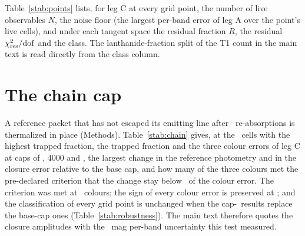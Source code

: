 \documentclass[11pt]{article}
\newcommand{\Cboth}{C\xspace}
\newcommand{\Aleg}{A\xspace}
\newcommand{\dRT}{d_{\rm RT}}
\newcommand{\Xlan}{X_{\rm 4Ln}}
\newcommand{\Mej}{M_{\rm ej}}
\newcommand{\vej}{v_{\rm ej}}
\newcommand{\chires}{\chi^2_{\rm res}/{\rm dof}}
\newcommand{\Msun}{M_\odot}
\begin{document}
Table~\ref{stab:points} lists, for leg \Cboth at every grid point, the number of live observables $N$, the noise floor (the largest per-band error of leg \Aleg over the point's live cells), and under each tangent space the residual fraction $R$, the residual $\chires$ and the class. The lanthanide-fraction split of the T1 count in the main text is read directly from the class column.

\begin{table}
\centering
\caption{\textbf{Leg \Cboth at every grid point under the four tangent spaces.} T0: $(\ln\Mej,\ln\vej,\ln\Xlan)$; T1: T0 with a free grey magnitude per epoch; T2: T0 with a free colour temperature; T3: T0 with a free blue second component. A dash marks a point with no evaluable fit.}
\label{stab:points}
\scriptsize

\end{table}

\clearpage
\section{The chain cap}\label{ssec:chain}

A reference packet that has not escaped its emitting line after \ChainBase\ re-absorptions is thermalized in place (Methods). Table~\ref{stab:chain} gives, at the \ChainCells\ cells with the highest trapped fraction, the trapped fraction and the three colour errors of leg \Cboth at caps of \ChainBase, 4000 and \ChainTop, the largest change in the reference photometry and in the closure error relative to the base cap, and how many of the three colours met the pre-declared criterion that the change stay below \ChainRelMax\ of the colour error. The criterion was met at \ChainCriterion\ colours; the sign of every colour error is preserved at \ChainSigns; and the classification of every grid point is unchanged when the cap-\ChainTop\ results replace the base-cap ones (Table~\ref{stab:robustness}). The main text therefore quotes the closure amplitudes with the \ChainDmChange\ mag per-band uncertainty this test measured.

\begin{table}[h]
\centering
\caption{\textbf{The chain-cap test.} Cells are $(\Mej/\Msun,\vej/c,\Xlan)$ at the epoch given, ordered by trapped fraction at the base cap. $\max|\delta m_{\rm ref}|$ is the largest per-band change of the reference photometry from the base cap; $\max|\delta\dRT|$ the largest per-band change of the closure error; the two agree to rounding because the closure legs do not chain and their photometry is independent of the cap, so the cap enters $\dRT$ only through the reference.}
\label{stab:chain}
\resizebox{\textwidth}{!}{}
\end{table}
\end{document}
